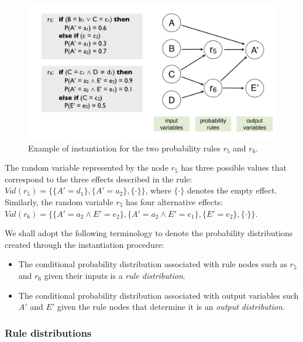 \begin{figure}[ht]
\centering
\includegraphics[scale=0.25]{imgs/ruleinstantiation.pdf}
\caption{Example of instantiation for the two probability rules $r_5$ and $r_6$. }
\label{fig:instantiationprob}
\end{figure}

The random variable represented by the node $r_5$ has three possible values that correspond to the three effects described in the rule: $\mathit{Val}(r_5) = \{ \{A'\!=\!d_1\}, \{A'\!=\!a_2\}, \{\cdot\}\}$, where $\{\cdot\}$ denotes the empty effect.  Similarly, the random variable $r_5$ has four alternative effects: $\mathit{Val}(r_6) = \{\{A'\!=\!a_2 \land E'\!=\!e_2\}, \{A'\!=\!a_2 \land E'\!=\!e_1\}, \{E'=e_2\}, \{\cdot\}\}$. 

We shall adopt the following terminology to denote the probability distributions created through the instantiation procedure: 
\begin{itemize}
\item The conditional probability distribution associated with rule nodes such as $r_5$ and $r_6$ given their inputs is a \textit{rule distribution}.
\item The conditional probability distribution associated with output variables such $A'$ and $E'$ given the rule nodes that determine it is an \textit{output distribution}.
\end{itemize}

\subsubsection*{Rule distributions}

